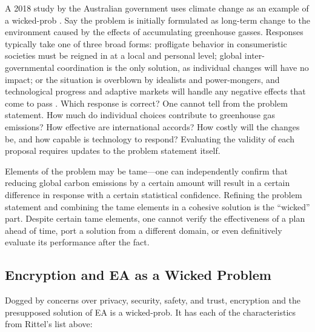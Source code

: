 A 2018 study by the Australian government uses climate change as an example of a \ac{wicked-prob}
\cite{commission_tackling_2018}. Say the problem is initially formulated as long-term change to the environment caused
by the effects of accumulating greenhouse gasses. Responses typically take one of three broad forms: profligate behavior
in consumeristic societies must be reigned in at a local and personal level; global inter-governmental coordination is
the only solution, as individual changes will have no impact; or the situation is overblown by idealists and
power-mongers, and technological progress and adaptive markets will handle any negative effects that come to pass
\cite{commission_tackling_2018}. Which response is correct? One cannot tell from the problem statement. How much do
individual choices contribute to greenhouse gas emissions? How effective are international accords? How costly will the
changes be, and how capable is technology to respond? Evaluating the validity of each proposal requires updates to the
problem statement itself.

Elements of the problem may be tame---one can independently confirm that reducing global carbon emissions by a certain
amount will result in a certain difference in response with a certain statistical confidence. Refining the problem
statement and combining the tame elements in a cohesive solution is the ``wicked'' part. Despite certain tame elements,
one cannot verify the effectiveness of a plan ahead of time, port a solution from a different domain, or even
definitively evaluate its performance after the fact.

\subsection{Encryption and EA as a Wicked Problem}

Dogged by concerns over privacy, security, safety, and trust, \ac{encryption} and the presupposed solution of \ac{EA} is
a \ac{wicked-prob}. It has each of the characteristics from Rittel's list above:

